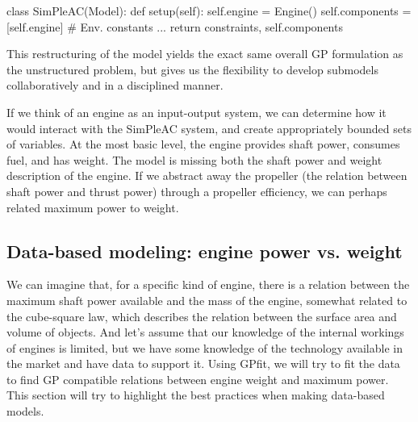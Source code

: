 \begin{python}
class SimPleAC(Model):
    def setup(self):
        self.engine = Engine()
        self.components = [self.engine]
        # Env. constants
        ...
        return constraints, self.components
\end{python}

This restructuring of the model yields the exact same overall \gls{GP} formulation
as the unstructured problem, but gives us the flexibility to develop submodels
collaboratively and in a disciplined manner.

If we think of an engine as an input-output system, we can determine how it
would interact with the SimPleAC system, and create appropriately bounded
sets of variables.
At the most basic level, the engine provides shaft power, consumes fuel, 
and has weight. The model is missing both the shaft power and weight description
of the engine. If we abstract away the propeller (the relation between shaft
power and thrust power) through a propeller efficiency,
we can perhaps related maximum power to weight.

\subsection{Data-based modeling: engine power vs. weight}
\label{s:datafit}

We can imagine that, for a specific kind of engine, there is a relation between the 
maximum shaft power available and the mass of the engine, somewhat related to the 
cube-square law, which describes the relation between the surface area and volume 
of objects. And let's assume that our knowledge of the internal workings of engines
is limited, but we have some knowledge of the technology available in the market
and have data to support it. Using GPfit, we will try to fit the data to find
\gls{GP} compatible relations between engine weight and maximum power. This section
will try to highlight the best practices when making data-based models. 

